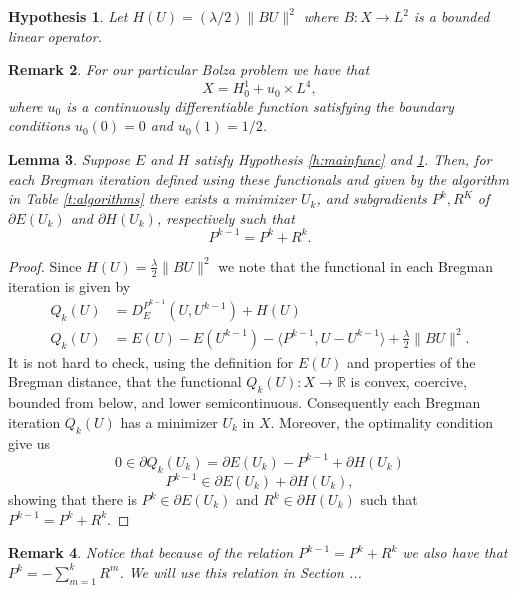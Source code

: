 \documentclass[11pt]{article}
\newcommand{\R}{\mathbb{R}}
\theoremstyle{plain}
\newtheorem{Lemma}{Lemma}[section]
\newtheorem{Remark}[Lemma]{Remark}
\newtheorem{Hypothesis}[Lemma]{Hypothesis}
\begin{document}
\begin{Hypothesis}\label{h:constraint}
 Let $H(U) =(\lambda/2) \|BU\|^2 $ where $B: X \rightarrow L^2$ is a bounded linear operator.
 \end{Hypothesis}

\begin{Remark}
For our particular Bolza problem we have that $$X= H^1_0 + u_0 \times L^4,$$ where $u_0$ is a continuously differentiable function satisfying the boundary conditions  $u_0(0)=0$ and $u_0(1) = 1/2$.
\end{Remark}

\begin{Lemma}\label{l:welldefined}
Suppose $E$ and $H$ satisfy Hypothesis \ref{h:mainfunc} and \ref{h:constraint}. Then, for each Bregman iteration defined using these functionals and given by the algorithm in Table \ref{t:algorithms} there exists a minimizer $U_k$, and subgradients $P^k, R^K$ of $\partial E(U_k)$ and $\partial H(U_k)$, respectively such that $$P^{k-1} = P^k +R^k.$$ %
\end{Lemma}

\begin{proof}
Since $H(U) =  \frac{\lambda}{2} \|B U\|^2$ we note that the functional in each Bregman iteration is given by
\begin{align*}
Q_k(U) &= D^{P^{k-1}}_E(U,U^{k-1}) + H(U)\\
Q_k(U) &= E(U) - E(U^{k-1}) - \langle P^{k-1}, U-U^{k-1} \rangle + \frac{\lambda}{2} \|B U\|^2.
\end{align*}
It is not hard to check, using the definition for $E(U)$ and properties of the Bregman distance, that the functional $Q_k(U): X \rightarrow \R $ is convex, coercive, bounded from below, and  lower semicontinuous. Consequently each Bregman iteration $Q_k(U)$ has a minimizer $U_k$ in $X$. Moreover, the optimality condition give us
\[ 0 \in  \partial Q_k(U_k) = \partial E(U_k ) - P^{k-1} + \partial H(U_k) \]
\[ P^{k-1} \in \partial E(U_k ) + \partial H(U_k), \]
showing that there is $P^k \in  \partial E(U_k )$ and $R^k \in  \partial H(U_k)$ such that $P^{k-1}= P^k + R^k$.

\end{proof}

\begin{Remark} Notice that because of the relation $P^{k-1} = P^k + R^k$ we also have that $P^k = -\sum_{m=1}^k R^m$. We will use this relation in Section ...
\end{Remark}
\end{document}
